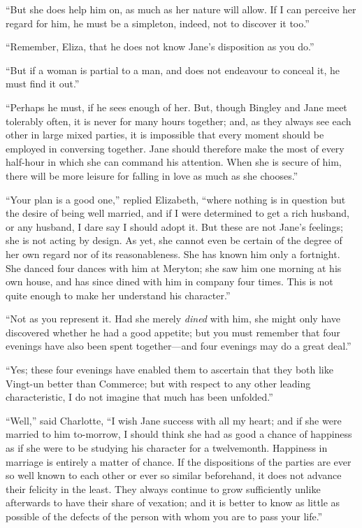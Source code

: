 ``But she does help him on, as much as her nature will allow.
If I can perceive her regard for him, he must be a simpleton,
indeed, not to discover it too.''

``Remember, Eliza, that he does not know Jane's disposition as
you do.''

``But if a woman is partial to a man, and does not endeavour to
conceal it, he must find it out.''

``Perhaps he must, if he sees enough of her.  But, though
Bingley and Jane meet tolerably often, it is never for many
hours together; and, as they always see each other in large
mixed parties, it is impossible that every moment should be
employed in conversing together.  Jane should therefore make
the most of every half-hour in which she can command his
attention.  When she is secure of him, there will be more leisure
for falling in love as much as she chooses.''

``Your plan is a good one,'' replied Elizabeth, ``where nothing is
in question but the desire of being well married, and if I were
determined to get a rich husband, or any husband, I dare say I
should adopt it.  But these are not Jane's feelings; she is not
acting by design.  As yet, she cannot even be certain of the
degree of her own regard nor of its reasonableness.  She has
known him only a fortnight.  She danced four dances with him
at Meryton; she saw him one morning at his own house, and
has since dined with him in company four times.  This is not
quite enough to make her understand his character.''

``Not as you represent it.  Had she merely \emph{dined} with him, she
might only have discovered whether he had a good appetite; but
you must remember that four evenings have also been spent
together---and four evenings may do a great deal.''

``Yes; these four evenings have enabled them to ascertain that
they both like Vingt-un better than Commerce; but with respect
to any other leading characteristic, I do not imagine that much
has been unfolded.''

``Well,'' said Charlotte, ``I wish Jane success with all my heart;
and if she were married to him to-morrow, I should think she
had as good a chance of happiness as if she were to be studying
his character for a twelvemonth.  Happiness in marriage is
entirely  a matter of chance.  If the dispositions of the parties
are ever so well known to each other or ever so similar beforehand,
it does not advance their felicity in the least.  They always
continue to grow sufficiently unlike afterwards to have their
share of vexation; and it is better to know as little as possible
of the defects of the person with whom you are to pass your life.''

